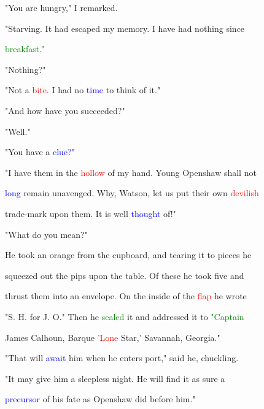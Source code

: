 "You are \textcolor{BurntOrange}{hungry,"} I remarked.



 "Starving. It had \textcolor{BurntOrange}{escaped} my memory. I have had nothing since

 \textcolor{green}{breakfast."}



 "Nothing?"



 "Not a \textcolor{red}{bite.} I had no \textcolor{blue}{time} to think of it."



 "And how have you \textcolor{BurntOrange}{succeeded?"}



 "Well."



 "You have a \textcolor{blue}{clue?"}



 "I have them in the \textcolor{red}{hollow} of my hand. \textcolor{BurntOrange}{Young} Openshaw shall not

 \textcolor{blue}{long} remain unavenged. Why, Watson, let us put their own \textcolor{red}{devilish}

 trade-mark upon them. It is well \textcolor{blue}{thought} of!"



 "What do you mean?"



 He took an orange from the cupboard, and tearing it to pieces he

 squeezed out the pips upon the table. Of these he took five and

 thrust them into an envelope. On the inside of the \textcolor{red}{flap} he wrote

 "S. H. for J. O." Then he \textcolor{green}{sealed} it and addressed it to \textcolor{green}{"Captain}

 James Calhoun, Barque \textcolor{red}{'Lone} \textcolor{BurntOrange}{Star,'} Savannah, Georgia."



 "That will \textcolor{blue}{await} him when he enters port," said he, \textcolor{BurntOrange}{chuckling.}

 "It may give him a sleepless night. He will find it as sure a

 \textcolor{blue}{precursor} of his \textcolor{BurntOrange}{fate} as Openshaw did before him."



